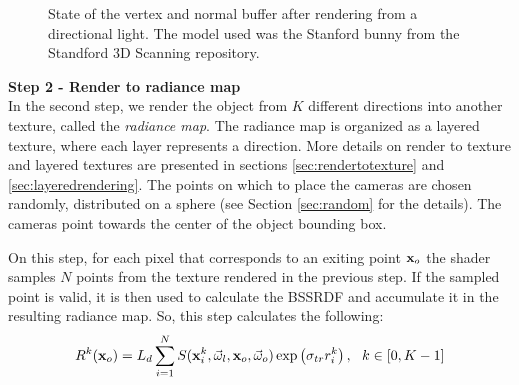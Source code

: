 \begin{figure}
\centering
{}
\label{fig:lightbuffers}
\caption{State of the vertex and normal buffer after rendering from a directional light. The model used was the Stanford bunny from the Standford 3D Scanning repository.}
\end{figure}
\FloatBarrier
\textbf{Step 2 - Render to radiance map} \\
In the second step, we render the object from $K$ different directions into another texture, called the \emph{radiance map}. The radiance map is organized as a layered texture, where each layer represents a direction. More details on render to texture and layered textures are presented in sections \ref{sec:rendertotexture} and \ref{sec:layeredrendering}. The points on which to place the cameras are chosen randomly, distributed on a sphere (see Section \ref{sec:random} for the details). The cameras point towards the center of the object bounding box.

On this step, for each pixel that corresponds to an exiting point $\mathbf{x}_o$ the shader samples $N$ points from the texture rendered in the previous step. If the sampled point is valid, it is then used to calculate the BSSRDF and accumulate it in the resulting radiance map. So, this step calculates the following:
$$
R^{k}(\mathbf{x}_o) = L_d \sum_{i = 1}^N S(\mathbf{x}^{k}_i, \vec{\omega}_l, \mathbf{x}_o, \vec{\omega}_o) \exp\left(\sigma_{tr} r^{k}_i\right), \ \ k \in [0,K-1] 
\label{eq:evolution_step}
$$

